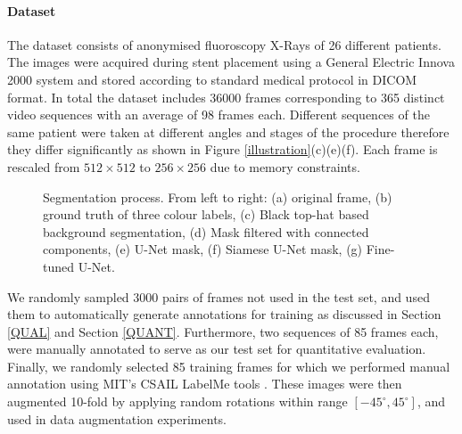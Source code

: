 \documentclass{bmvc2k}
\begin{document}
\paragraph{Dataset}
The dataset consists of anonymised fluoroscopy X-Rays of 26 different patients.  The images were acquired during stent placement using a General Electric Innova 2000 system and stored according to standard medical protocol in DICOM format. In total the dataset includes 36000 frames corresponding to 365 distinct video sequences with an average of 98 frames each. Different sequences of the same patient were taken at different angles and stages of the procedure therefore they differ significantly as shown in Figure \ref{illustration}(c)(e)(f). Each frame is rescaled from  $512\times512$  to $256\times256$ due to memory constraints. 
\begin{figure}[ht]
\begin{adjustbox}{width=\textwidth}
	
	\caption{ Segmentation process.  From left to right:  (a) original frame, (b)  ground truth of three colour labels, (c) Black top-hat based background segmentation,  (d) Mask filtered with connected components, (e) U-Net mask, (f) Siamese U-Net mask, (g) Fine-tuned U-Net. }
	\label{annotations}
\end{adjustbox}

\end{figure}
We randomly sampled 3000 pairs of frames not used in the test set, and used them to automatically generate annotations for training as discussed in Section \ref{QUAL} and Section \ref{QUANT}.  Furthermore, two sequences of 85 frames each, were manually annotated to serve as our test set for quantitative evaluation. Finally, we randomly selected 85 training frames for which we performed manual annotation using MIT's CSAIL LabelMe tools \cite{LabelMe}. These images were then augmented 10-fold by applying random rotations within range $[-45^\circ,45^\circ]$, and used in data augmentation experiments.
\end{document}
